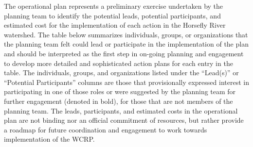 \documentclass[
  letterpaper,
  DIV=11,
  numbers=noendperiod]{scrreprt}
\begin{document}

The operational plan represents a preliminary exercise undertaken by the
planning team to identify the potential leads, potential participants,
and estimated cost for the implementation of each action in the Horsefly
River watershed. The table below summarizes individuals, groups, or
organizations that the planning team felt could lead or participate in
the implementation of the plan and should be interpreted as the first
step in on-going planning and engagement to develop more detailed and
sophisticated action plans for each entry in the table. The individuals,
groups, and organizations listed under the ``Lead(s)'' or ``Potential
Participants'' columns are those that provisionally expressed interest
in participating in one of those roles or were suggested by the planning
team for further engagement (denoted in bold), for those that are not
members of the planning team. The leads, participants, and estimated
costs in the operational plan are not binding nor an official commitment
of resources, but rather provide a roadmap for future coordination and
engagement to work towards implementation of the WCRP.
\end{document}
